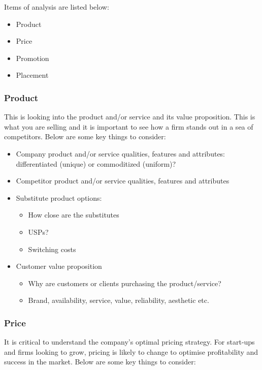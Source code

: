 \documentclass[a4paper]{article}
\begin{document}
{\vspace{5pt}
\noindent Items of analysis are listed below:
\begin{itemize}
	\item Product
	\item Price
	\item Promotion
	\item Placement
\end{itemize}

\subsubsection{Product}
This is looking into the product and/or service and its value proposition. This is what you are selling and it is important to see how a firm stands out in a sea of competitors. Below are some key things to consider:

\begin{itemize}
	\item Company product and/or service qualities, features and attributes: differentiated (unique) or commoditized (uniform)?
	\item Competitor product and/or service qualities, features and attributes
	\item Substitute product options:
		\begin{itemize}
			\item How close are the substitutes
			\item USPs?
			\item Switching costs
		\end{itemize}
	\item Customer value proposition
		\begin{itemize}
			\item Why are customers or clients purchasing the product/service?
			\item Brand, availability, service, value, reliability, aesthetic etc.
		\end{itemize}
\end{itemize}

\subsubsection{Price}
It is critical to understand the company's optimal pricing strategy. For start-ups and firms looking to grow, pricing is likely to change to optimise profitability and success in the market. Below are some key things to consider:

}
\end{document}

